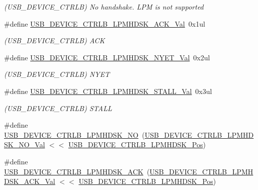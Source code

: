 \begin{DoxyCompactItemize}
\begin{DoxyCompactList}\small\item\em (U\+S\+B\+\_\+\+D\+E\+V\+I\+C\+E\+\_\+\+C\+T\+R\+LB) No handshake. L\+PM is not supported \end{DoxyCompactList}\item 
\#define \mbox{\hyperlink{group___s_a_m_d21___u_s_b_ga579aa1294380225d109d6ee2a2d4727d}{U\+S\+B\+\_\+\+D\+E\+V\+I\+C\+E\+\_\+\+C\+T\+R\+L\+B\+\_\+\+L\+P\+M\+H\+D\+S\+K\+\_\+\+A\+C\+K\+\_\+\+Val}}~0x1ul
\begin{DoxyCompactList}\small\item\em (U\+S\+B\+\_\+\+D\+E\+V\+I\+C\+E\+\_\+\+C\+T\+R\+LB) A\+CK \end{DoxyCompactList}\item 
\#define \mbox{\hyperlink{group___s_a_m_d21___u_s_b_ga7f5bfd93b23484ad9c4619c32ebe8389}{U\+S\+B\+\_\+\+D\+E\+V\+I\+C\+E\+\_\+\+C\+T\+R\+L\+B\+\_\+\+L\+P\+M\+H\+D\+S\+K\+\_\+\+N\+Y\+E\+T\+\_\+\+Val}}~0x2ul
\begin{DoxyCompactList}\small\item\em (U\+S\+B\+\_\+\+D\+E\+V\+I\+C\+E\+\_\+\+C\+T\+R\+LB) N\+Y\+ET \end{DoxyCompactList}\item 
\#define \mbox{\hyperlink{group___s_a_m_d21___u_s_b_ga249000ba2e98b6207cbb2176465bf154}{U\+S\+B\+\_\+\+D\+E\+V\+I\+C\+E\+\_\+\+C\+T\+R\+L\+B\+\_\+\+L\+P\+M\+H\+D\+S\+K\+\_\+\+S\+T\+A\+L\+L\+\_\+\+Val}}~0x3ul
\begin{DoxyCompactList}\small\item\em (U\+S\+B\+\_\+\+D\+E\+V\+I\+C\+E\+\_\+\+C\+T\+R\+LB) S\+T\+A\+LL \end{DoxyCompactList}\item 
\#define \mbox{\hyperlink{group___s_a_m_d21___u_s_b_ga3f9c58708c3f0d2322e7917f6bed2e91}{U\+S\+B\+\_\+\+D\+E\+V\+I\+C\+E\+\_\+\+C\+T\+R\+L\+B\+\_\+\+L\+P\+M\+H\+D\+S\+K\+\_\+\+NO}}~(\mbox{\hyperlink{group___s_a_m_d21___u_s_b_gaead1ace8b3c95e077a583fc16f732901}{U\+S\+B\+\_\+\+D\+E\+V\+I\+C\+E\+\_\+\+C\+T\+R\+L\+B\+\_\+\+L\+P\+M\+H\+D\+S\+K\+\_\+\+N\+O\+\_\+\+Val}} $<$$<$ \mbox{\hyperlink{group___s_a_m_d21___u_s_b_ga7bbe2998f650533b2cc87bb63f7a28de}{U\+S\+B\+\_\+\+D\+E\+V\+I\+C\+E\+\_\+\+C\+T\+R\+L\+B\+\_\+\+L\+P\+M\+H\+D\+S\+K\+\_\+\+Pos}})
\item 
\#define \mbox{\hyperlink{group___s_a_m_d21___u_s_b_ga15ac3734fd19f8a2006243e60d8f0ad3}{U\+S\+B\+\_\+\+D\+E\+V\+I\+C\+E\+\_\+\+C\+T\+R\+L\+B\+\_\+\+L\+P\+M\+H\+D\+S\+K\+\_\+\+A\+CK}}~(\mbox{\hyperlink{group___s_a_m_d21___u_s_b_ga579aa1294380225d109d6ee2a2d4727d}{U\+S\+B\+\_\+\+D\+E\+V\+I\+C\+E\+\_\+\+C\+T\+R\+L\+B\+\_\+\+L\+P\+M\+H\+D\+S\+K\+\_\+\+A\+C\+K\+\_\+\+Val}} $<$$<$ \mbox{\hyperlink{group___s_a_m_d21___u_s_b_ga7bbe2998f650533b2cc87bb63f7a28de}{U\+S\+B\+\_\+\+D\+E\+V\+I\+C\+E\+\_\+\+C\+T\+R\+L\+B\+\_\+\+L\+P\+M\+H\+D\+S\+K\+\_\+\+Pos}})

\end{DoxyCompactItemize}
